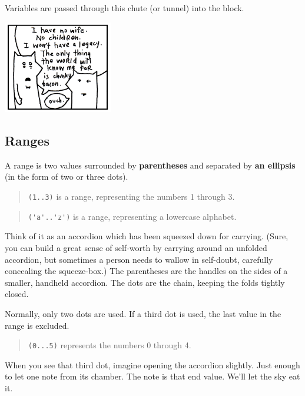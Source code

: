 \documentclass[10pt,twoside]{report}
\begin{document}
Variables are passed through this chute (or tunnel) into the block.

	\includegraphics[width=0.3575\textwidth]{cache/14.png}




\subsection{Ranges}



A range is two values surrounded by {\bf parentheses} and separated by
{\bf an ellipsis} (in the form of two or three dots).

\begin{quote}
\lstinline[breaklines=true]|(1..3)| is a range, representing the
numbers 1 through 3.\end{quote}


\begin{quote}
\lstinline[breaklines=true]|('a'..'z')| is a range, representing a
lowercase alphabet.\end{quote}


Think of it as an accordion which has been squeezed down for carrying.
(Sure, you can build a great sense of self-worth by carrying around an
unfolded accordion, but sometimes a person needs to wallow in
self-doubt, carefully concealing the squeeze-box.)  The parentheses
are the handles on the sides of a smaller, handheld accordion.  The
dots are the chain, keeping the folds tightly closed.

Normally, only two dots are used.  If a third dot is used, the last
value in the range is excluded.

\begin{quote}
\lstinline[breaklines=true]|(0...5)| represents the numbers 0 through
4.\end{quote}


When you see that third dot, imagine opening the accordion slightly.
Just enough to let one note from its chamber.  The note is that end
value.  We'll let the sky eat it.
\end{document}
